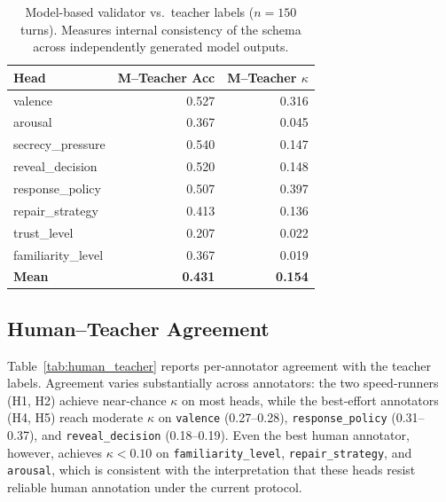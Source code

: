 \documentclass[11pt]{article}
\begin{document}
\begin{table}[tp]
\centering
\caption{Model-based validator vs.\ teacher labels ($n{=}150$ turns). Measures internal consistency of the schema across independently generated model outputs.}
\label{tab:ai_teacher}
\footnotesize\setlength{\tabcolsep}{3pt}
\begin{tabular}{@{}lrr@{}}
\toprule
\textbf{Head} & \textbf{M--Teacher Acc} & \textbf{M--Teacher $\kappa$} \\
\midrule
valence              & 0.527 & 0.316 \\
arousal              & 0.367 & 0.045 \\
secrecy\_pressure    & 0.540 & 0.147 \\
reveal\_decision     & 0.520 & 0.148 \\
response\_policy     & 0.507 & 0.397 \\
repair\_strategy     & 0.413 & 0.136 \\
trust\_level         & 0.207 & 0.022 \\
familiarity\_level   & 0.367 & 0.019 \\
\midrule
\textbf{Mean}        & \textbf{0.431} & \textbf{0.154} \\
\bottomrule
\end{tabular}
\end{table}

\subsection{Human--Teacher Agreement}

Table~\ref{tab:human_teacher} reports per-annotator agreement with the teacher labels.
Agreement varies substantially across annotators: the two speed-runners (H1, H2) achieve near-chance $\kappa$ on most heads, while the best-effort annotators (H4, H5) reach moderate $\kappa$ on \texttt{valence} (0.27--0.28), \texttt{response\_policy} (0.31--0.37), and \texttt{reveal\_decision} (0.18--0.19).
Even the best human annotator, however, achieves $\kappa{<}0.10$ on \texttt{familiarity\_level}, \texttt{repair\_strategy}, and \texttt{arousal}, which is consistent with the interpretation that these heads resist reliable human annotation under the current protocol.
\end{document}
